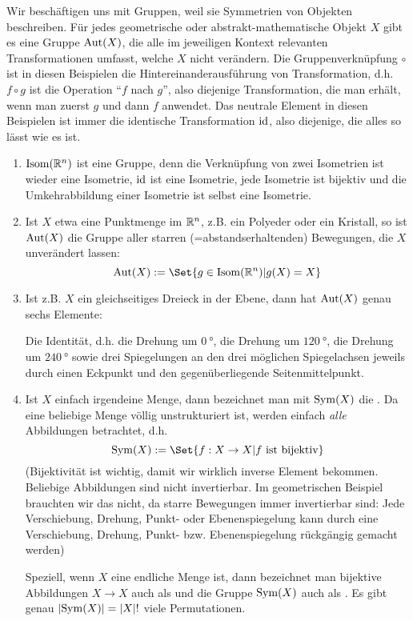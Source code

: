 \begin{example}[Symmetriegruppen]
Wir beschäftigen uns mit Gruppen, weil sie Symmetrien von Objekten beschreiben. Für jedes geometrische oder abstrakt-mathematische Objekt $X$ gibt es eine Gruppe $\operatorname{Aut}(X)$, die alle im jeweiligen Kontext relevanten Transformationen umfasst, welche $X$ nicht verändern. Die Gruppenverknüpfung $\circ$ ist in diesen Beispielen die Hintereinanderausführung von Transformation, d.h. $f\circ g$ ist die Operation \enquote{$f$ nach $g$}, also diejenige Transformation, die man erhält, wenn man zuerst $g$ und dann $f$ anwendet. Das neutrale Element in diesen Beispielen ist immer die identische Transformation $\operatorname{id}$, also diejenige, die alles so lässt wie es ist.

\begin{enumerate}
\item $\operatorname{Isom}(\mathbb{R}^n)$ ist eine Gruppe, denn die Verknüpfung von zwei Isometrien ist wieder eine Isometrie, $\operatorname{id}$ ist eine Isometrie, jede Isometrie ist bijektiv und die Umkehrabbildung einer Isometrie ist selbst eine Isometrie.
\item Ist $X$ etwa eine Punktmenge im $\mathbb{R}^n$, z.B. ein Polyeder oder ein Kristall, so ist $\operatorname{Aut}(X)$ die Gruppe aller starren (=abstandserhaltenden) Bewegungen, die $X$ unverändert lassen:
\[\Aut(X) := \Set{g\in\Isom(\IR^n) | g(X) = X}\]
\item Ist z.B. $X$ ein gleichseitiges Dreieck in der Ebene, dann hat $\operatorname{Aut}(X)$ genau sechs Elemente:

Die Identität, d.h. die Drehung um $\SI{0}{\degree}$, die Drehung um $\SI{120}{\degree}$, die Drehung um $\SI{240}{\degree}$ sowie drei Spiegelungen an den drei möglichen Spiegelachsen jeweils durch einen Eckpunkt und den gegenüberliegende Seitenmittelpunkt.
\item Ist $X$ einfach irgendeine Menge, dann bezeichnet man mit $\operatorname{Sym}(X)$ die . Da eine beliebige Menge völlig unstrukturiert ist, werden einfach \emph{alle} Abbildungen betrachtet, d.h.
\[\Sym(X) := \Set{f: X\to X | f\text{ ist bijektiv}}\]
(Bijektivität ist wichtig, damit wir wirklich inverse Element bekommen. Beliebige Abbildungen sind nicht invertierbar. Im geometrischen Beispiel brauchten wir das nicht, da starre Bewegungen immer invertierbar sind: Jede Verschiebung, Drehung, Punkt- oder Ebenenspiegelung kann durch eine Verschiebung, Drehung, Punkt- bzw. Ebenenspiegelung rückgängig gemacht werden)

Speziell, wenn $X$ eine endliche Menge ist, dann bezeichnet man bijektive Abbildungen $X\to X$ auch als  und die Gruppe $\operatorname{Sym}(X)$ auch als . Es gibt genau $\lvert\operatorname{Sym}(X)\rvert = \lvert X\rvert!$ viele Permutationen.


\end{enumerate}
\end{example}
